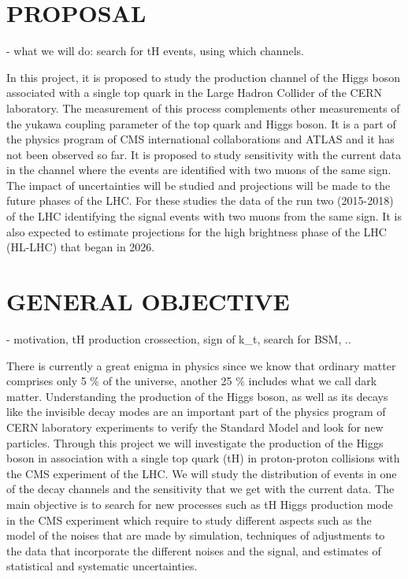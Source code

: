 \documentclass[final,3p]{CSP}
\begin{document}
\section{PROPOSAL}
- what we will do:  search for tH events, using which channels.

In this project, it is proposed to study the production channel of the Higgs boson associated with a single top quark in the Large 
Hadron Collider of the CERN laboratory. The measurement of this process complements other measurements of the yukawa coupling parameter 
of the top quark and Higgs boson. It is a part of the physics program of CMS international collaborations and ATLAS and it has not been 
observed so far. It is proposed to study sensitivity with the current data in the channel where the events are identified with two muons 
of the same sign. The impact of uncertainties will be studied and projections will be made to the future phases of the LHC. For these 
studies the data of the run two (2015-2018) of the LHC identifying the signal events with two muons from the same sign. It is also 
expected to estimate projections for the high brightness phase of the LHC (HL-LHC) that began in 2026.

\section{GENERAL OBJECTIVE}
- motivation, tH production crossection, sign of k_t, search for BSM, ..

There is currently a great enigma in physics since we know that ordinary matter comprises only 5 \% of the universe, another 
25 \% includes what we call dark matter. Understanding the production of the Higgs boson, as well as its decays like the invisible 
decay modes are an important part of the physics program of CERN laboratory experiments to verify the Standard Model and look for new 
particles. Through this project we will investigate the production of the Higgs boson in association with a single top quark (tH) 
in proton-proton collisions with the CMS experiment of the LHC. We will study the distribution of events in one of the decay channels and the sensitivity that we get with the current data. The main objective is to search for new processes such as tH Higgs production mode in the CMS experiment which require to study different aspects such as the model of the noises that are made by simulation, techniques of adjustments to the data that incorporate the different noises and the signal, and estimates of statistical and systematic uncertainties.
\end{document}
